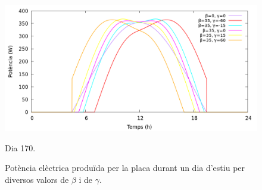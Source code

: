 \documentclass[11pt]{article}
\begin{document}
\begin{figure}[H]
    \centering
        \includegraphics[width=\textwidth]{dia_estiu_pot_plot.png}
        \caption{Dia 170.}
        \label{fig: potencia dia 170}
    \caption{Potència elèctrica produïda per la placa durant un dia d'estiu per diversos valors de $\beta$ i de $\gamma$.}
    \label{potencia dia estiu}
\end{figure}
\end{document}
